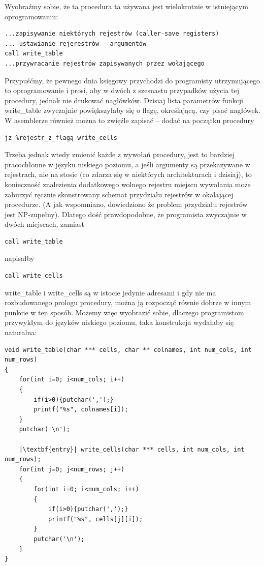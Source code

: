 Wyobraźmy sobie, że ta procedura ta używana jest wielokrotnie w istniejącym oprogramowaniu:
\begin{lstlisting}
...zapisywanie niektórych rejestrów (caller-save registers)
... ustawianie rejerestrów - argumentów
call write_table
...przywracanie rejestrów zapisywanych przez wołającego
\end{lstlisting}
Przypuśćmy, że pewnego dnia księgowy przychodzi do programisty utrzymującego to oprogramowanie i prosi, aby w dwóch z szesnastu przypadków użycia tej procedury, jednak nie drukować nagłówków. Dzisiaj lista parametrów funkcji write\_table zwyczajnie powiększyłaby się o flagę, określającą, czy pisać nagłówek. W asemblerze również można to zwięźle zapisać – dodać na początku procedury
\begin{lstlisting}
jz %rejestr_z_flagą write_cells
\end{lstlisting}
Trzeba jednak wtedy zmienić każde z wywołań procedury, jest to bardziej pracochłonne w języku niskiego poziomu, a jeśli argumenty są przekazywane w rejestrach, nie na stosie (co zdarza się w niektórych architekturach i dzisiaj), to konieczność znalezienia dodatkowego wolnego rejestru miejscu wywołania może zaburzyć ręcznie skonstrowany schemat przydziału rejestrów w okalającej procedurze. (A jak wspomniano, dowiedziono że problem przydziału rejestrów jest NP-zupełny\cite{REGISTER_ALLOCATION_CHAITIN1981}). Dlatego dość prawdopodobne, że programista zwyczajnie w dwóch miejscach, zamiast
\begin{lstlisting}
call write_table
\end{lstlisting}
napisałby 
\begin{lstlisting}
call write_cells
\end{lstlisting}
write\_table i write\_cells są w istocie jedynie adresami i gdy nie ma rozbudowanego prologu procedury, można ją rozpocząć równie dobrze w innym punkcie w ten sposób. Możemy więc wyobrazić sobie, dlaczego programistom przywykłym do języków niskiego poziomu, taka konstrukcja wydałaby się naturalna:


\lstset{
    escapechar=|,
    breaklines=true
}
\begin{lstlisting}
void write_table(char *** cells, char ** colnames, int num_cols, int num_rows)
{
    for(int i=0; i<num_cols; i++)
    {
        if(i>0){putchar(',');}
        printf("%s", colnames[i]);
    }
    putchar('\n');
    
    |\textbf{entry}| write_cells(char *** cells, int num_cols, int num_rows);
    for(int j=0; j<num_rows; j++)
    {
        for(int i=0; i<num_cols; i++)
        {
            if(i>0){putchar(',');}
            printf("%s", cells[j][i]);
        }
        putchar('\n');
    }
}
\end{lstlisting}

